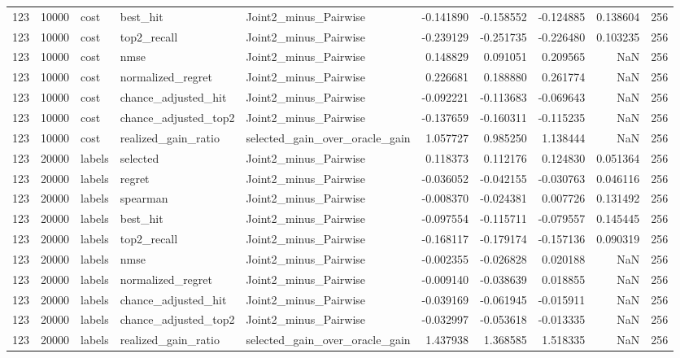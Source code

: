 \begin{tabular}{rrlllrrrrr}
123 & 10000 & cost & best_hit & Joint2_minus_Pairwise & -0.141890 & -0.158552 & -0.124885 & 0.138604 & 256 \\
123 & 10000 & cost & top2_recall & Joint2_minus_Pairwise & -0.239129 & -0.251735 & -0.226480 & 0.103235 & 256 \\
123 & 10000 & cost & nmse & Joint2_minus_Pairwise & 0.148829 & 0.091051 & 0.209565 & NaN & 256 \\
123 & 10000 & cost & normalized_regret & Joint2_minus_Pairwise & 0.226681 & 0.188880 & 0.261774 & NaN & 256 \\
123 & 10000 & cost & chance_adjusted_hit & Joint2_minus_Pairwise & -0.092221 & -0.113683 & -0.069643 & NaN & 256 \\
123 & 10000 & cost & chance_adjusted_top2 & Joint2_minus_Pairwise & -0.137659 & -0.160311 & -0.115235 & NaN & 256 \\
123 & 10000 & cost & realized_gain_ratio & selected_gain_over_oracle_gain & 1.057727 & 0.985250 & 1.138444 & NaN & 256 \\
123 & 20000 & labels & selected & Joint2_minus_Pairwise & 0.118373 & 0.112176 & 0.124830 & 0.051364 & 256 \\
123 & 20000 & labels & regret & Joint2_minus_Pairwise & -0.036052 & -0.042155 & -0.030763 & 0.046116 & 256 \\
123 & 20000 & labels & spearman & Joint2_minus_Pairwise & -0.008370 & -0.024381 & 0.007726 & 0.131492 & 256 \\
123 & 20000 & labels & best_hit & Joint2_minus_Pairwise & -0.097554 & -0.115711 & -0.079557 & 0.145445 & 256 \\
123 & 20000 & labels & top2_recall & Joint2_minus_Pairwise & -0.168117 & -0.179174 & -0.157136 & 0.090319 & 256 \\
123 & 20000 & labels & nmse & Joint2_minus_Pairwise & -0.002355 & -0.026828 & 0.020188 & NaN & 256 \\
123 & 20000 & labels & normalized_regret & Joint2_minus_Pairwise & -0.009140 & -0.038639 & 0.018855 & NaN & 256 \\
123 & 20000 & labels & chance_adjusted_hit & Joint2_minus_Pairwise & -0.039169 & -0.061945 & -0.015911 & NaN & 256 \\
123 & 20000 & labels & chance_adjusted_top2 & Joint2_minus_Pairwise & -0.032997 & -0.053618 & -0.013335 & NaN & 256 \\
123 & 20000 & labels & realized_gain_ratio & selected_gain_over_oracle_gain & 1.437938 & 1.368585 & 1.518335 & NaN & 256 \\

\end{tabular}
